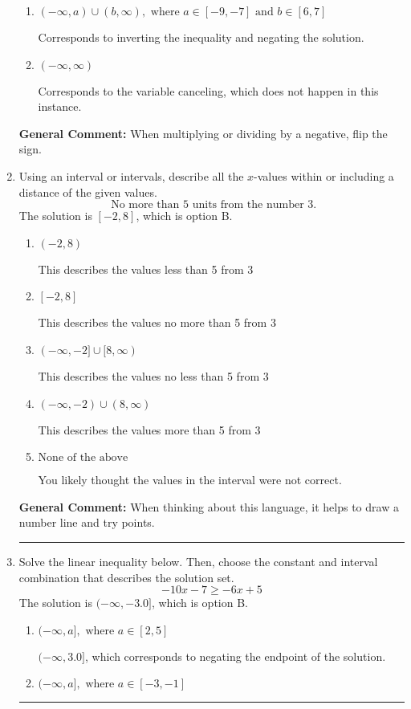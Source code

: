 \documentclass{extbook}[14pt]
\newcommand{\litem}[1]{\item #1

\rule{\textwidth}{0.4pt}}
\begin{document}
\begin{enumerate}
{\begin{enumerate}[label=\Alph*.]
 * Correct option.
\item \( (-\infty, a) \cup (b, \infty), \text{ where } a \in [-9, -7] \text{ and } b \in [6, 7] \)

Corresponds to inverting the inequality and negating the solution.
\item \( (-\infty, \infty) \)

Corresponds to the variable canceling, which does not happen in this instance.
\end{enumerate}

\textbf{General Comment:} When multiplying or dividing by a negative, flip the sign.
}
\litem{
Using an interval or intervals, describe all the $x$-values within or including a distance of the given values.
\[ \text{ No more than } 5 \text{ units from the number } 3. \]
The solution is \( [-2, 8] \), which is option B.\begin{enumerate}[label=\Alph*.]
\item \( (-2, 8) \)

This describes the values less than 5 from 3
\item \( [-2, 8] \)

This describes the values no more than 5 from 3
\item \( (-\infty, -2] \cup [8, \infty) \)

This describes the values no less than 5 from 3
\item \( (-\infty, -2) \cup (8, \infty) \)

This describes the values more than 5 from 3
\item \( \text{None of the above} \)

You likely thought the values in the interval were not correct.
\end{enumerate}

\textbf{General Comment:} When thinking about this language, it helps to draw a number line and try points.
}
\litem{
Solve the linear inequality below. Then, choose the constant and interval combination that describes the solution set.
\[ -10x -7 \geq -6x + 5 \]
The solution is \( (-\infty, -3.0] \), which is option B.\begin{enumerate}[label=\Alph*.]
\item \( (-\infty, a], \text{ where } a \in [2, 5] \)

 $(-\infty, 3.0]$, which corresponds to negating the endpoint of the solution.
\item \( (-\infty, a], \text{ where } a \in [-3, -1] \)


\end{enumerate}}
\end{enumerate}
\end{document}
